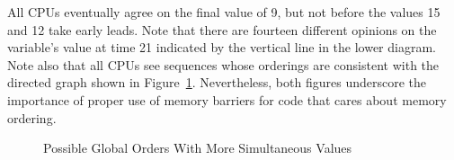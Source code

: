 All CPUs eventually agree on the final value of 9, but not before
the values 15 and 12 take early leads.
Note that there are fourteen different opinions on the variable's value
at time 21 indicated by the vertical line in the lower diagram.
Note also that all CPUs see sequences whose orderings are consistent with
the directed graph shown in
Figure~\ref{fig:advsync:Possible Global Orders With More Simultaneous Values}.
Nevertheless, both figures underscore the importance of
proper use of memory barriers for code that cares about memory ordering.
\fi

\begin{figure}[htb]
\centering
{}
\caption{Possible Global Orders With More Simultaneous Values}
\label{fig:advsync:Possible Global Orders With More Simultaneous Values}
\end{figure}

